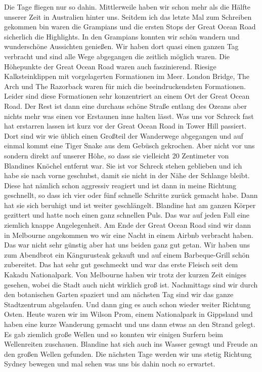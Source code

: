 \documentclass[11pt]{book}
\begin{document}
Die Tage fliegen nur so dahin. Mittlerweile haben wir schon mehr als die Hälfte unserer Zeit in Australien hinter uns. Seitdem 
ich das letzte Mal zum Schreiben gekommen bin waren die Grampians und die ersten Stops der Great Ocean Road sicherlich die 
Highlights. In den Grampians konnten wir schön wandern und wunderschöne Aussichten genießen. Wir haben dort quasi einen ganzen Tag 
verbracht und sind alle Wege abgegangen die zeitlich möglich waren. Die Höhepunkte der Great Ocean Road waren auch faszinierend.
Riesige Kalksteinklippen mit vorgelagerten Formationen im Meer. London Bridge, The Arch und The Razorback waren für mich die 
beeindruckendsten Formationen. Leider sind diese Formationen sehr konzentriert an einem Ort der Great Ocean Road. Der Rest ist 
dann eine durchaus schöne Straße entlang des Ozeans aber nichts mehr was einen vor Erstaunen inne halten lässt. Was uns vor Schreck 
fast hat erstarren lassen ist kurz vor der Great Ocean Road in Tower Hill passiert. Dort sind wir wie üblich einen Großteil der 
Wanderwege abgegangen und auf einmal kommt eine Tiger Snake aus dem Gebüsch gekrochen. Aber nicht vor uns sondern direkt auf unserer 
Höhe, so dass sie vielleicht 20 Zentimeter von Blandines Knöchel entfernt war. Sie ist vor Schreck stehen geblieben und ich habe sie 
nach vorne geschubst, damit sie nicht in der Nähe der Schlange bleibt. Diese hat nämlich schon aggressiv reagiert und ist dann in 
meine Richtung geschnellt, so dass ich vier oder fünf schnelle Schritte zurück gemacht habe. Dann hat sie sich beruhigt und ist weiter 
geschlängelt. Blandine hat am ganzen Körper gezittert und hatte noch einen ganz schnellen Puls. Das war auf jeden Fall eine 
ziemlich knappe Angelegenheit. 
Am Ende der Great Ocean Road sind wir dann in Melbourne angekommen wo wir eine Nacht in einem Airbnb verbracht haben. Das war nicht 
sehr günstig aber hat uns beiden ganz gut getan. Wir haben uns zum Abendbrot ein Kängurusteak gekauft und auf einem Barbeque-Grill 
schön zubereitet. Das hat sehr gut geschmeckt und war das erste Fleisch seit dem Kakadu Nationalpark. Von Melbourne haben wir 
trotz der kurzen Zeit einiges gesehen, wobei die Stadt auch nicht wirklich groß ist. Nachmittags sind wir durch den botanischen 
Garten spaziert und am nächsten Tag sind wir das ganze Stadtzentrum abgelaufen. Und dann ging es auch schon wieder weiter Richtung Osten.
Heute waren wir im Wilson Prom, einem Nationalpark in Gippsland und haben eine kurze Wanderung gemacht und uns dann etwas an den 
Strand gelegt. Es gab ziemlich große Wellen und so konnten wir einigen Surfern beim Wellenreiten zuschauen. Blandine hat sich 
auch ins Wasser gewagt und Freude an den großen Wellen gefunden. Die nächsten Tage werden wir uns stetig Richtung Sydney bewegen 
und mal sehen was uns bis dahin noch so erwartet.
\end{document}
